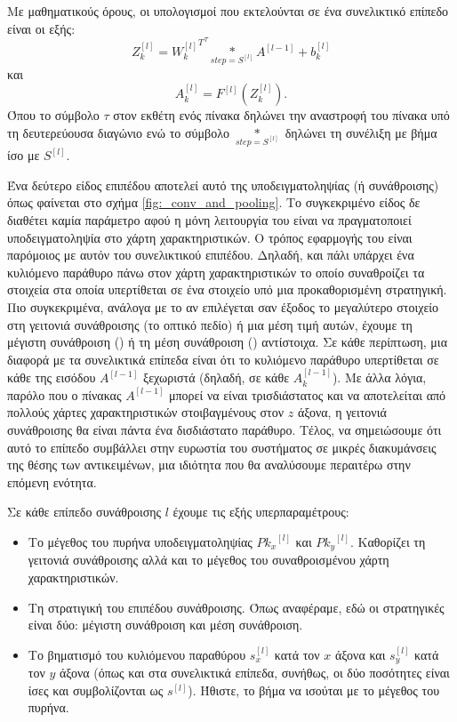 Με μαθηματικούς όρους, οι υπολογισμοί που εκτελούνται σε ένα συνελικτικό επίπεδο είναι οι εξής:
\begin{equation}
  Z^{[l]}_k = {{W^{[l]}_k}^T }^{\tau} \underset{{step=S^{[l]}}} {\ast} A^{[l-1]} + b^{[l]}_k
\end{equation}
και
\begin{equation}
  A^{[l]}_k = F^{[l]}(Z^{[l]}_k).
\end{equation}
Όπου το σύμβολο $\tau$ στον εκθέτη ενός πίνακα δηλώνει την αναστροφή του πίνακα υπό τη δευτερεύουσα διαγώνιο ενώ το σύμβολο $\underset{{step=S^{[l]}}} {\ast}$ δηλώνει τη συνέλιξη με βήμα ίσο με $S^{[l]}$. \par

Ένα δεύτερο είδος επιπέδου αποτελεί αυτό της υποδειγματοληψίας (ή συνάθροισης) όπως φαίνεται στο σχήμα \ref{fig:_conv_and_pooling}. Το συγκεκριμένο είδος δε διαθέτει καμία παράμετρο αφού η μόνη λειτουργία του είναι να πραγματοποιεί υποδειγματοληψία στο χάρτη χαρακτηριστικών. Ο τρόπος εφαρμογής του είναι παρόμοιος με αυτόν του συνελικτικού επιπέδου. Δηλαδή, και πάλι υπάρχει ένα κυλιόμενο παράθυρο πάνω στον χάρτη χαρακτηριστικών το οποίο συναθροίζει τα στοιχεία στα οποία υπερτίθεται σε ένα στοιχείο υπό μια προκαθορισμένη στρατηγική. Πιο συγκεκριμένα, ανάλογα με το αν επιλέγεται σαν έξοδος το μεγαλύτερο στοιχείο στη γειτονιά συνάθροισης (το οπτικό πεδίο) ή μια μέση τιμή αυτών, έχουμε τη μέγιστη συνάθροιση () ή τη μέση συνάθροιση () αντίστοιχα. Σε κάθε περίπτωση, μια διαφορά με τα συνελικτικά επίπεδα είναι ότι το κυλιόμενο παράθυρο υπερτίθεται σε κάθε  της εισόδου $A^{[l-1]}$ ξεχωριστά (δηλαδή, σε κάθε $A^{[l-1]}_k$). Με άλλα λόγια, παρόλο που ο πίνακας $A^{[l-1]}$ μπορεί να είναι τρισδιάστατος και να αποτελείται από πολλούς χάρτες χαρακτηριστικών στοιβαγμένους στον $z$ άξονα, η γειτονιά συνάθροισης θα είναι πάντα ένα δισδιάστατο παράθυρο. Τέλος, να σημειώσουμε ότι αυτό το επίπεδο συμβάλλει στην ευρωστία του συστήματος σε μικρές διακυμάνσεις της θέσης των αντικειμένων, μια ιδιότητα που θα αναλύσουμε περαιτέρω στην επόμενη ενότητα. \par

Σε κάθε επίπεδο συνάθροισης $l$ έχουμε τις εξής υπερπαραμέτρους:
\begin{itemize}
  \item Το μέγεθος του πυρήνα υποδειγματοληψίας ${Pk_x}^{[l]}$ και ${Pk_y}^{[l]}$. Καθορίζει τη γειτονιά συνάθροισης αλλά και το μέγεθος του συναθροισμένου χάρτη χαρακτηριστικών.
  \item Τη στρατιγική του επιπέδου συνάθροισης. Όπως αναφέραμε, εδώ οι στρατηγικές είναι δύο: μέγιστη συνάθροιση και μέση συνάθροιση.
  \item Το βηματισμό του κυλιόμενου παραθύρου $s^{[l]}_x$ κατά τον $x$ άξονα και $s^{[l]}_y$ κατά τον $y$ άξονα (όπως και στα συνελικτικά επίπεδα, συνήθως, οι δύο ποσότητες είναι ίσες και συμβολίζονται ως $s^{[l]}$). Ήθιστε, το βήμα να ισούται με το μέγεθος του πυρήνα.
\end{itemize}

